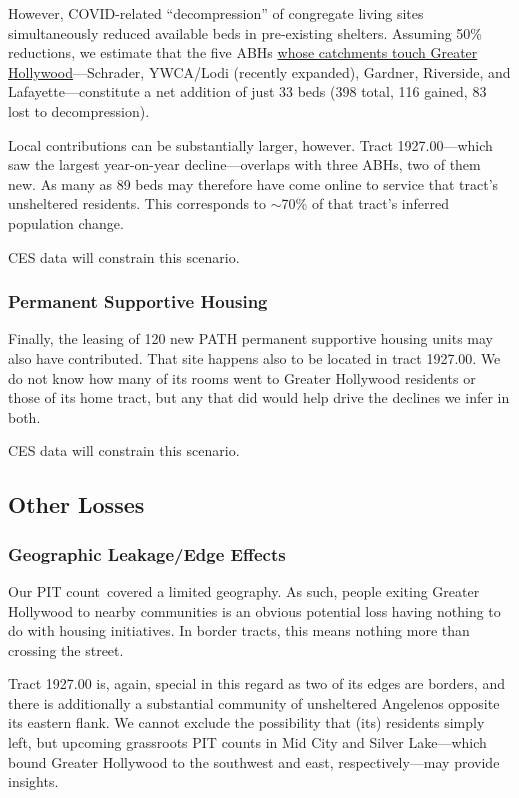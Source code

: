 \documentclass[11pt,twocolumn]{article}
\def\Count{count}
\def\resp{respectively}
\begin{document}
However, COVID-related ``decompression'' of congregate living sites simultaneously reduced available beds in 
pre-existing shelters. Assuming 50\% reductions, we estimate that the five ABHs \href{https://arcg.is/0fy81}
{whose catchments touch Greater Hollywood}---Schrader, YWCA/Lodi (recently expanded), Gardner, Riverside, and 
Lafayette---constitute a net addition of just 33 beds (398 total, 116 gained, 83 lost to decompression). 

Local contributions can be substantially larger, however. Tract 1927.00---which saw the largest year-on-year 
decline---overlaps with three ABHs, two of them new. As many as 89 beds may therefore have come online to service 
that tract's unsheltered residents. This corresponds to $\sim$70\% of that tract's inferred population change.

CES data will constrain this scenario.

\subsubsection{Permanent Supportive Housing}

Finally, the leasing of 120 new PATH permanent supportive housing units may also have contributed. 
That site happens also to be located in tract 1927.00. We do not know how many of its rooms went to Greater Hollywood 
residents or those of its home tract, but any that did would help drive the declines we infer in both.

CES data will constrain this scenario.

\subsection{Other Losses}

\subsubsection{Geographic Leakage/Edge Effects}

Our PIT \Count\ covered a limited geography. As such, people exiting Greater Hollywood to nearby communities
is an obvious potential loss having nothing to do with housing initiatives. In border tracts, this means nothing more than
crossing the street. 

Tract 1927.00 is, again, special in this regard as two of its edges are borders, and there is additionally a substantial 
community of unsheltered Angelenos opposite its eastern flank. We cannot exclude the possibility that (its) residents simply 
left, but upcoming grassroots PIT counts in Mid City and Silver Lake---which bound Greater Hollywood to the southwest and 
east, \resp---may provide insights.
\end{document}

